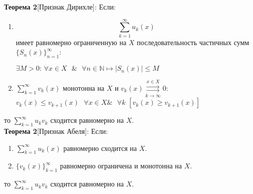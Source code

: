 \documentclass[a4paper,12pt]{article} %
\begin{document}
\noindent \textbf{Теорема 2}[Признак Дирихле]: 
\newline
Если:
\begin{enumerate}
    \item $$\sum_{k = 1}^{\infty}  u_k(x)$$ имеет равномерно ограниченную на $X$ последовательность частичных сумм $\{S_n(x)\}_{n=1}^\infty$: 
    \newline
    
    $\exists M > 0 \text{: } \forall x \in X \text{ }\& \text{ } \forall n \in \mathds{N} \longmapsto |S_n(x)| \leq M$
    
    \item $\sum\limits_{k = 1}^{\infty}  v_k(x)$ монотонна на $X$ и $v_k(x) \overset{x \in X}{\underset{k \rightarrow \infty}{\rightrightarrows}} 0$: \newline
    \\[5 mm]
    $v_k(x) \leq v_{k+1}(x) \text{ } \forall x \in X \text{} \& \text{ } \forall k$
    \newline
    $[v_k(x) \geq v_{k+1}(x)]$
    
\end{enumerate}

\hspace*{40 mm}то $\sum\limits_{k=1}^{\infty} u_k v_k$ сходится равномерно на $X$.
\\[5 mm]
\noindent \textbf{Теорема 2}[Признак Абеля]: 
Если:
\begin{enumerate}
    \item  $\sum\limits_{k=1}^\infty u_k(x)$ равномерно сходится на $X$.
    
    \item ${\{v_k(x)\}_{k=1}^\infty}$ равномерно ограничена и монотонна на $X$.
\end{enumerate}

\hspace*{40 mm}то $\sum\limits_{k=1}^{\infty} u_k v_k$ сходится равномерно на $X$.
\end{document}
